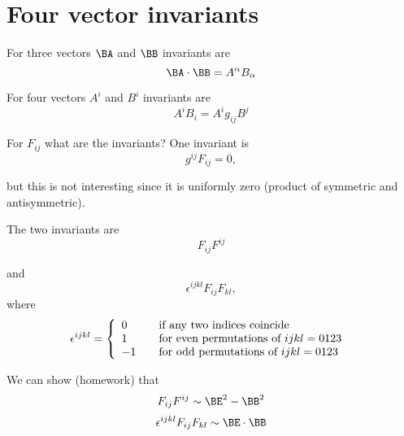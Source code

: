 %
%
\section{Four vector invariants}

For three vectors \(\BA\) and \(\BB\) invariants are
%
\begin{equation}\label{eqn:relativisticElectrodynamicsL11:510}
\BA \cdot \BB = A^\alpha B_\alpha
\end{equation}

For four vectors \(A^i\) and \(B^i\) invariants are
%
\begin{equation}\label{eqn:relativisticElectrodynamicsL11:530}
A^i B_i = A^i g_{i j} B^j
\end{equation}

For \(F_{i j}\) what are the invariants?  One invariant is
%
\begin{equation}\label{eqn:relativisticElectrodynamicsL11:550}
g^{i j} F_{i j} = 0,
\end{equation}

but this is not interesting since it is uniformly zero (product of symmetric and antisymmetric).

The two invariants are
%
\begin{equation}\label{eqn:relativisticElectrodynamicsL11:570}
F_{i j}F^{i j}
\end{equation}

and
%
\begin{equation}\label{eqn:relativisticElectrodynamicsL11:590}
\epsilon^{i j k l} F_{i j}F_{k l},
\end{equation}
where
\begin{equation}\label{eqn:relativisticElectrodynamicsL11:610}
\epsilon^{i j k l} =
\left\{
\begin{array}{l l}
0 & \quad \mbox{if any two indices coincide} \\
1 & \quad \mbox{for even permutations of \(i j k l=0123\) } \\
-1 & \quad \mbox{for odd permutations of \(i j k l=0123\) } \\
\end{array}
\right.
\end{equation}

We can show (homework) that
%
\begin{equation}\label{eqn:relativisticElectrodynamicsL11:630}
F_{i j}F^{i j} \sim \BE^2 - \BB^2
\end{equation}
%
\begin{equation}\label{eqn:relativisticElectrodynamicsL11:650}
\epsilon^{i j k l} F_{i j}F_{k l} \sim \BE \cdot \BB
\end{equation}

